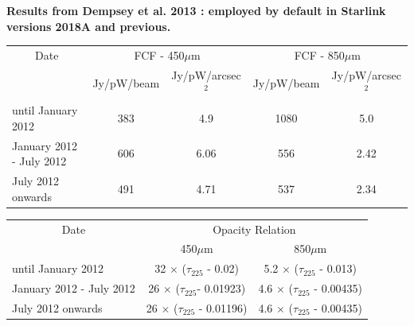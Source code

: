 \textbf{Results from Dempsey et al. 2013 \cite{dempsey12}: employed by default in Starlink versions 2018A and previous.}\\
\begin{table}[h!]
\begin{center}
\begin{tabular}{|l|c|c|c|c|}
 \hline
 \multicolumn{1}{|c|}{Date} &
 \multicolumn{2}{c|}{FCF - 450$\mu$m} &
 \multicolumn{2}{c|}{FCF - 850$\mu$m} \\
\cline{2-5}
& Jy/pW/beam &Jy/pW/arcsec$^2$ & Jy/pW/beam &Jy/pW/arcsec$^2$ \\
 \hline
until January 2012 &383  & 4.9&1080 &5.0 \\
January 2012 - July 2012&606&6.06 &556 &2.42 \\
July 2012 onwards&491 &4.71 &537 &2.34 \\
\hline
\end{tabular}
\end{center}
\end{table}
\vspace{-2mm}
\begin{table}[h!]
\begin{center}
\begin{tabular}{|l|c|c|}
 \hline
 \multicolumn{1}{|c}{Date} & \multicolumn{2}{|c|}{Opacity Relation}  \\ \cline{2-3}
                           & 450$\mu$m  & 850$\mu$m \\ \hline
until January 2012       & 32 $\times$ ($\tau_{225}$ - 0.02)    & 5.2 $\times$ ($\tau_{225}$ - 0.013)  \\
January 2012 - July 2012 & 26 $\times$ ($\tau_{225}$- 0.01923)  & 4.6 $\times$ ($\tau_{225}$ - 0.00435)  \\
July 2012 onwards        & 26 $\times$ ($\tau_{225}$ - 0.01196) & 4.6 $\times$ ($\tau_{225}$ - 0.00435)  \\
\hline
\end{tabular}
\end{center}
\end{table}
